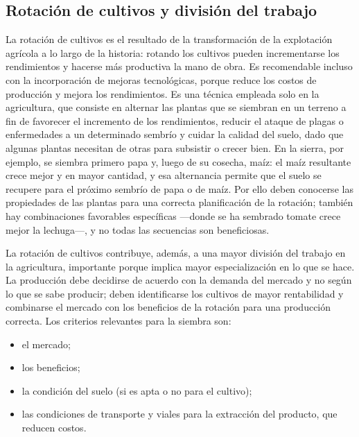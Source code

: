 \documentclass[
  man,
  floatsintext,
  longtable,
  a4paper,
  nolmodern,
  notxfonts,
  notimes,
  12pt,
  colorlinks=true,linkcolor=blue,citecolor=blue,urlcolor=blue]{apa7}
\providecommand{\tightlist}{%
  \setlength{\itemsep}{0pt}\setlength{\parskip}{0pt}}
\begin{document}
\subsection{Rotación de cultivos y división del
trabajo}\label{rotaciuxf3n-de-cultivos-y-divisiuxf3n-del-trabajo}

La rotación de cultivos es el resultado de la transformación de la
explotación agrícola a lo largo de la historia: rotando los cultivos
pueden incrementarse los rendimientos y hacerse más productiva la mano
de obra. Es recomendable incluso con la incorporación de mejoras
tecnológicas, porque reduce los costos de producción y mejora los
rendimientos. Es una técnica empleada solo en la agricultura, que
consiste en alternar las plantas que se siembran en un terreno a fin de
favorecer el incremento de los rendimientos, reducir el ataque de plagas
o enfermedades a un determinado sembrío y cuidar la calidad del suelo,
dado que algunas plantas necesitan de otras para subsistir o crecer
bien. En la sierra, por ejemplo, se siembra primero papa y, luego de su
cosecha, maíz: el maíz resultante crece mejor y en mayor cantidad, y esa
alternancia permite que el suelo se recupere para el próximo sembrío de
papa o de maíz. Por ello deben conocerse las propiedades de las plantas
para una correcta planificación de la rotación; también hay
combinaciones favorables específicas ---donde se ha sembrado tomate
crece mejor la lechuga---, y no todas las secuencias son beneficiosas.

La rotación de cultivos contribuye, además, a una mayor división del
trabajo en la agricultura, importante porque implica mayor
especialización en lo que se hace. La producción debe decidirse de
acuerdo con la demanda del mercado y no según lo que se sabe producir;
deben identificarse los cultivos de mayor rentabilidad y combinarse el
mercado con los beneficios de la rotación para una producción correcta.
Los criterios relevantes para la siembra son:

\begin{itemize}
\tightlist
\item
  el mercado;
\item
  los beneficios;
\item
  la condición del suelo (si es apta o no para el cultivo);
\item
  las condiciones de transporte y viales para la extracción del
  producto, que reducen costos.
\end{itemize}
\end{document}
